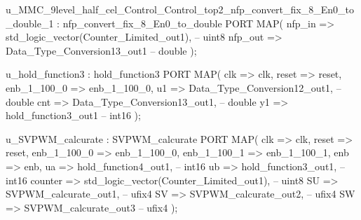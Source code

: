 \begin{mylisting}[language=VHDL,caption=MSSRDCDB制御\&SVPWMモジュール,label=appF_Control_top2_module_VHDL]
  u_MMC_9level_half_cel_Control_Control_top2_nfp_convert_fix_8_En0_to_double_1 : nfp_convert_fix_8_En0_to_double
    PORT MAP( nfp_in => std_logic_vector(Counter_Limited_out1),  -- uint8
              nfp_out => Data_Type_Conversion13_out1  -- double
              );

  u_hold_function3 : hold_function3
    PORT MAP( clk => clk,
              reset => reset,
              enb_1_100_0 => enb_1_100_0,
              u1 => Data_Type_Conversion12_out1,  -- double
              cnt => Data_Type_Conversion13_out1,  -- double
              y1 => hold_function3_out1  -- int16
              );

  u_SVPWM_calcurate : SVPWM_calcurate
    PORT MAP( clk => clk,
              reset => reset,
              enb_1_100_0 => enb_1_100_0,
              enb_1_100_1 => enb_1_100_1,
              enb => enb,
              ua => hold_function4_out1,  -- int16
              ub => hold_function3_out1,  -- int16
              counter => std_logic_vector(Counter_Limited_out1),  -- uint8
              SU => SVPWM_calcurate_out1,  -- ufix4
              SV => SVPWM_calcurate_out2,  -- ufix4
              SW => SVPWM_calcurate_out3  -- ufix4
              );


\end{mylisting}
